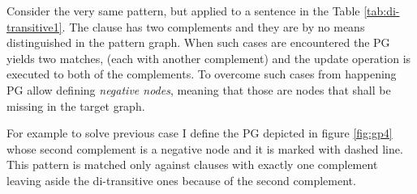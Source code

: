 
Consider the very same pattern, but applied to a sentence in the Table \ref{tab:di-transitive1}. 
The clause has two complements and they are by no means distinguished in the pattern graph. When such cases are encountered the PG yields two matches, (each with another complement) and the update operation is executed to both of the complements. To overcome such cases from happening PG allow defining \textit{negative nodes}, meaning that those are nodes that shall be missing in the target graph.

For example to solve previous case I define the PG depicted in figure \ref{fig:gp4} whose second complement is a negative node and it is marked with dashed line. This pattern is matched only against clauses with exactly one complement leaving aside the di-transitive ones because of the second complement.

